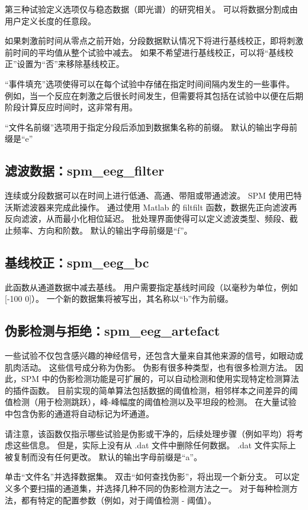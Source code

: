 第三种试验定义选项仅与稳态数据（即光谱）的研究相关。
可以将数据分割成由用户定义长度的任意段。

如果刺激前时间从零点之前开始，分段数据默认情况下将进行基线校正，即将刺激前时间的平均值从整个试验中减去。
如果不希望进行基线校正，可以将“基线校正”设置为“否”来移除基线校正。

“事件填充”选项使得可以在每个试验中存储在指定时间间隔内发生的一些事件。
例如，当一个反应在刺激之后很长时间发生，但需要将其包括在试验中以便在后期阶段计算反应时间时，这非常有用。

“文件名前缀”选项用于指定分段后添加到数据集名称的前缀。
默认的输出字母前缀是“e”


\subsection{滤波数据：spm\_eeg\_filter}

连续或分段数据可以在时间上进行低通、高通、带阻或带通滤波。
SPM 使用巴特沃斯滤波器来完成此操作。
通过使用 Matlab 的 filtfilt 函数，数据先正向滤波再反向滤波，从而最小化相位延迟。
批处理界面使得可以定义滤波类型、频段、截止频率、方向和阶数。
默认的输出字母前缀是“f”。


\subsection{基线校正：spm\_eeg\_bc}

此函数从通道数据中减去基线。
用户需要指定基线时间段（以毫秒为单位，例如 [-100 0]）。
一个新的数据集将被写出，其名称以“b”作为前缀。


\subsection{伪影检测与拒绝：spm\_eeg\_artefact}

一些试验不仅包含感兴趣的神经信号，还包含大量来自其他来源的信号，如眼动或肌肉活动。
这些信号成分称为伪影。
伪影有很多种类型，也有很多检测方法。
因此，SPM 中的伪影检测功能是可扩展的，可以自动检测和使用实现特定检测算法的插件函数。
目前实现的简单算法包括数据的阈值检测，相邻样本之间差异的阈值检测（用于检测跳跃），峰-峰幅度的阈值检测以及平坦段的检测。
在大量试验中包含伪影的通道将自动标记为坏通道。

请注意，该函数仅指示哪些试验是伪影或干净的，后续处理步骤（例如平均）将考虑这些信息。
但是，实际上没有从 .dat 文件中删除任何数据。
.dat 文件实际上被复制而没有任何更改。
默认的输出字母前缀是“a”。

单击“文件名”并选择数据集。
双击“如何查找伪影”，将出现一个新分支。
可以定义多个要扫描的通道集，并选择几种不同的伪影检测方法之一。
对于每种检测方法，都有特定的配置参数（例如，对于阈值检测 - 阈值）。


